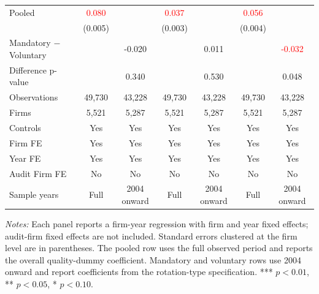 \begin{table}[htbp]
\begin{threeparttable}
{\begin{tabular}{l cc cc cc}
Pooled & \textcolor{red}{0.080\sym{***}} &  & \textcolor{red}{0.037\sym{***}} &  & \textcolor{red}{0.056\sym{***}} &  \\
 & (0.005) &  & (0.003) &  & (0.004) &  \\
Mandatory $-$ Voluntary &  & -0.020 &  & 0.011 &  & \textcolor{red}{-0.032\sym{**}} \\
Difference p-value &  & 0.340 &  & 0.530 &  & 0.048 \\
Observations & 49,730 & 43,228 & 49,730 & 43,228 & 49,730 & 43,228 \\
Firms & 5,521 & 5,287 & 5,521 & 5,287 & 5,521 & 5,287 \\
\midrule
Controls & Yes & Yes & Yes & Yes & Yes & Yes \\
Firm FE & Yes & Yes & Yes & Yes & Yes & Yes \\
Year FE & Yes & Yes & Yes & Yes & Yes & Yes \\
Audit Firm FE & No & No & No & No & No & No \\
Sample years & Full & 2004 onward & Full & 2004 onward & Full & 2004 onward \\
\bottomrule
\end{tabular}}
\begin{tablenotes}\footnotesize
\item \textit{Notes:} Each panel reports a firm-year regression with firm and year fixed effects; audit-firm fixed effects are not included. Standard errors clustered at the firm level are in parentheses. The pooled row uses the full observed period and reports the overall quality-dummy coefficient. Mandatory and voluntary rows use 2004 onward and report coefficients from the rotation-type specification. *** \(p<0.01\), ** \(p<0.05\), * \(p<0.10\).
\end{tablenotes}
\end{threeparttable}
\end{table}
